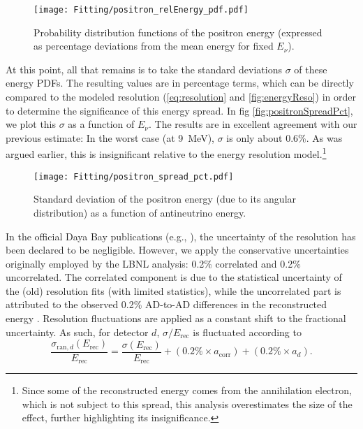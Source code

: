 \documentclass[../thesis.tex]{subfiles}
\begin{document}
\begin{figure}[ht]
  \texttt{[image: Fitting/positron\_relEnergy\_pdf.pdf]}
  \caption{Probability distribution functions of the positron energy (expressed as percentage deviations from the mean energy for fixed $E_\nu$).}
  \label{fig:positronEnergyDiffPDF}
\end{figure}

At this point, all that remains is to take the standard deviations $\sigma$ of these energy PDFs. The resulting values are in percentage terms, which can be directly compared to the modeled resolution (\autoref{eq:resolution} and \autoref{fig:energyReso}) in order to determine the significance of this energy spread. In fig \autoref{fig:positronSpreadPct}, we plot this $\sigma$ as a function of $E_\nu$. The results are in excellent agreement with our previous estimate: In the worst case (at 9~MeV), $\sigma$ is only about 0.6\%. As was argued earlier, this is insignificant relative to the energy resolution model.\footnote{Since some of the reconstructed energy comes from the annihilation electron, which is not subject to this spread, this analysis overestimates the size of the effect, further highlighting its insignificance.}

\begin{figure}[ht]
  \texttt{[image: Fitting/positron\_spread\_pct.pdf]}
  \caption{Standard deviation of the positron energy (due to its angular distribution) as a function of antineutrino energy.}
  \label{fig:positronSpreadPct}
\end{figure}

In the official Daya Bay publications (e.g., \cite{An_2017}), the uncertainty of the resolution has been declared to be negligible. However, we apply the conservative uncertainties originally employed by the LBNL analysis: 0.2\% correlated and 0.2\% uncorrelated. The correlated component is due to the statistical uncertainty of the (old) resolution fits (with limited statistics), while the uncorrelated part is attributed to the observed 0.2\% AD-to-AD differences in the reconstructed energy \cite{berkeley_toymc}. Resolution fluctuations are applied as a constant shift to the fractional uncertainty. As such, for detector $d$, $\sigma/E_{\mathrm{rec}}$ is fluctuated according to
\begin{equation}
  \frac{\sigma_{\mathrm{ran},d}(E_{\mathrm{rec}})}{E_{\mathrm{rec}}} = \frac{\sigma(E_{\mathrm{rec}})}{E_{\mathrm{rec}}} + (0.2\% \times a_{\mathrm{corr}})  + (0.2\% \times a_d).
\end{equation}
\end{document}
